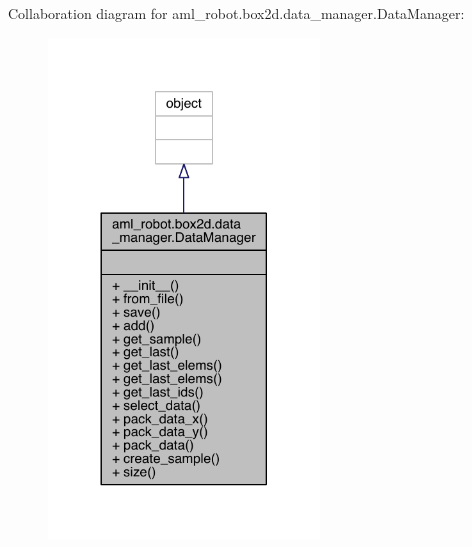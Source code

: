 Collaboration diagram for aml\+\_\+robot.\+box2d.\+data\+\_\+manager.\+Data\+Manager\+:\nopagebreak
\begin{figure}[H]
\begin{center}
\leavevmode
\includegraphics[width=204pt]{classaml__robot_1_1box2d_1_1data__manager_1_1_data_manager__coll__graph}
\end{center}
\end{figure}
